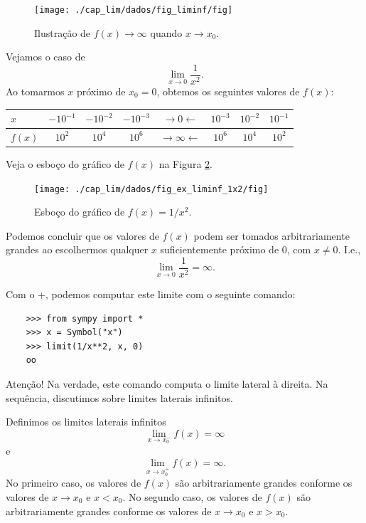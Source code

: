 \begin{figure}[H]
  \centering
  \texttt{[image: ./cap\_lim/dados/fig\_liminf/fig]}
  \caption{Ilustração de $f(x)\to\infty$ quando $x\to x_0$.}
  \label{fig:liminf}
\end{figure}


\begin{ex}
  Vejamos o caso de
  \begin{equation}
    \lim_{x\to 0} \frac{1}{x^2}.
  \end{equation}
  Ao tomarmos $x$ próximo de $x_0=0$, obtemos os seguintes valores de $f(x)$:
  \begin{center}
    \begin{tabular}[H]{l|ccc|c|ccc}
      $x$ & $-10^{-1}$ & $-10^{-2}$ & $-10^{-3}$ & $\rightarrow 0 \leftarrow$ & $10^{-3}$ & $10^{-2}$ & $10^{-1}$ \\\hline
      $f(x)$ & $10^{2}$ & $10^{4}$ & $10^{6}$ & $\rightarrow \infty \leftarrow$ & $10^{6}$ & $10^{4}$ & $10^{2}$
    \end{tabular}
  \end{center}
  Veja o esboço do gráfico de $f(x)$ na Figura \ref{fig:ex_liminf_1x2}.

\begin{figure}[H]
  \centering
  \texttt{[image: ./cap\_lim/dados/fig\_ex\_liminf\_1x2/fig]}
  \caption{Esboço do gráfico de $f(x)=1/x^2$.}
  \label{fig:ex_liminf_1x2}
\end{figure}  

  Podemos concluir que os valores de $f(x)$ podem ser tomados arbitrariamente grandes ao escolhermos qualquer $x$ suficientemente próximo de $0$, com $x\neq 0$. I.e.,
  \begin{equation}
    \lim_{x\to 0}\frac{1}{x^2} = \infty.
  \end{equation}

  \ifispython
  Com o {\python}+{\sympy}, podemos computar este limite com o seguinte comando:
  \begin{lstlisting}
    >>> from sympy import *
    >>> x = Symbol("x")
    >>> limit(1/x**2, x, 0)
    oo
  \end{lstlisting}
  Atenção! Na verdade, este comando computa o limite lateral à direita. Na sequência, discutimos sobre limites laterais infinitos.
  \fi
\end{ex}

Definimos os limites laterais infinitos
\begin{equation}
  \lim_{x\to x_0^-} f(x) = \infty
\end{equation}
e
\begin{equation}
  \lim_{x\to x_0^+} f(x) = \infty.
\end{equation}
No primeiro caso, os valores de $f(x)$ são arbitrariamente grandes conforme os valores de $x\to x_0$ e $x<x_0$. No segundo caso, os valores de $f(x)$ são arbitrariamente grandes conforme os valores de $x\to x_0$ e $x>x_0$.

